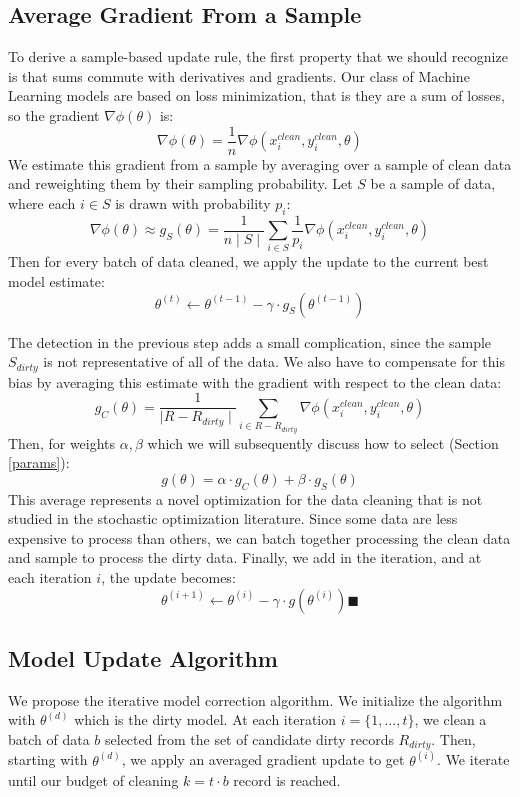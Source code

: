 \subsection{Average Gradient From a Sample}
To derive a sample-based update rule, the first property that we should recognize is that sums commute with derivatives and gradients.
Our class of Machine Learning models are based on loss minimization, that is they are a sum of losses, so the gradient $\nabla\phi(\theta)$ is:
\[
\nabla\phi(\theta) = \frac{1}{n} \nabla\phi(x_i^{clean},y_i^{clean},\theta)
\]
We estimate this gradient from a sample by averaging over a sample of clean data and reweighting them by their sampling probability.
Let $S$ be a sample of data, where each $i \in S$ is drawn with probability $p_i$:
\[
\nabla\phi(\theta) \approx g_{S}(\theta) = \frac{1}{n\mid S \mid} \sum_{i \in S}\frac{1}{p_i}\nabla\phi(x_i^{clean},y_i^{clean},\theta)
\]
Then for every batch of data cleaned, we apply the update to the current best model estimate:
\[
\theta^{(t)} \leftarrow \theta^{(t-1)} - \gamma \cdot g_{S}(\theta^{(t-1)})
\]

The detection in the previous step adds a small complication, since the sample $S_{dirty}$ is not representative of all of the data.
We also have to compensate for this bias by averaging this estimate with the gradient with respect to the clean data:
\[
g_C(\theta) = \frac{1}{\mid R - R_{dirty}\mid}\sum_{i \in R - R_{dirty}}\nabla\phi(x_i^{clean},y_i^{clean},\theta)
\]
Then, for weights $\alpha,\beta$ which we will subsequently discuss how to select (Section \ref{params}):
\[
g(\theta) = \alpha \cdot g_C(\theta) + \beta \cdot g_S(\theta)
\]
This average represents a novel optimization for the data cleaning that is not studied in the stochastic optimization literature.
Since some data are less expensive to process than others, we can batch together processing the clean data and sample to process the dirty data.
Finally, we add in the iteration, and at each iteration $i$, the update becomes:
\[
\theta^{(i+1)} \leftarrow \theta^{(i)} - \gamma \cdot g(\theta^{(i)}) \blacksquare
\]

\subsection{Model Update Algorithm}
We propose the iterative model correction algorithm.
We initialize the algorithm with $\theta^{(d)}$ which is the dirty model.
At each iteration $i=\{1,...,t\}$, we clean a batch of data $b$ selected from the set of candidate dirty records $R_{dirty}$.
Then, starting with $\theta^{(d)}$, we apply an averaged gradient update to get $\theta^{(i)}$.
We iterate until our budget of cleaning $k = t \cdot b$ record is reached.

